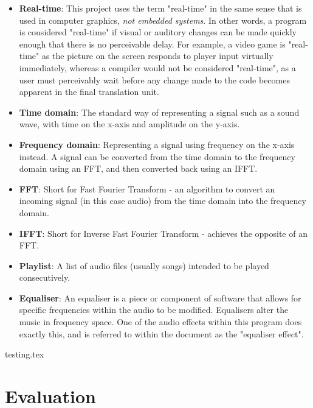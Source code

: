 \documentclass{article}
\begin{document}
	\begin{itemize}
		\item \textbf{Real-time}: This project uses the term "real-time" in the same sense that is used in computer graphics, \textit{not embedded systems}. In other words, a program is considered "real-time" if visual or auditory changes can be made quickly enough that there is no perceivable delay. For example, a video game is "real-time" as the picture on the screen responds to player input virtually immediately, whereas a compiler would not be considered "real-time", as a user must perceivably wait before any change made to the code becomes apparent in the final translation unit.
		
		\item \textbf{Time domain}: The standard way of representing a signal such as a sound wave, with time on the x-axis and amplitude on the y-axis.
		
		\item \textbf{Frequency domain}: Representing a signal using frequency on the x-axis instead. A signal can be converted from the time domain to the frequency domain using an FFT, and then converted back using an IFFT.
		
		\item \textbf{FFT}: Short for Fast Fourier Transform - an algorithm to convert an incoming signal (in this case audio) from the time domain into the frequency domain.
		
		\item \textbf{IFFT}: Short for Inverse Fast Fourier Transform - achieves the opposite of an FFT.
		
		\item \textbf{Playlist}: A list of audio files (usually songs)  intended to be played consecutively.
		
		\item \textbf{Equaliser}: An equaliser is a piece or component of software that allows for specific frequencies within the audio to be modified. Equalisers alter the music in frequency space. One of the audio effects within this program does exactly this, and is referred to within the document as the "equaliser effect".
	\end{itemize}

	
	
	
	 {testing.tex}

	\section {  Evaluation }
\end{document}
